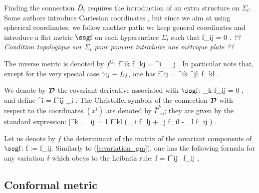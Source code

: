 Finding the connection $\tilde D_i$
requires the introduction of an extra structure 
on $\Sigma_t$. Some authors introduce Cartesian coordinates
\cite{ShibaN95,BaumgS98}, but since we aim at using spherical coordinates,
we follow another path: we keep general coordinates and introduce
a flat metric $\w{f}$ on each hypersurface $\Sigma_t$ such that
\be \label{e:f_notime}
	 f_{ij} = 0 . 
\ee
{\sl ?? Condition topologique sur $\Sigma_t$ pour pouvoir introduire
une m\'etrique plate ??}

The inverse metric is denoted by $f^{ij}$:
\be
	f^{ik} f_{kj} = \delta^i_{\ \, j} . 
\ee
In particular note that, except for the very special case
$\gamma_{ij}=f_{ij}$, one has
\be
	f^{ij} \not= \gm^{ik} \gm^{jl}\, f_{kl} .
\ee

We denote by $\mbox{\boldmath ${{\cal D}}$}$ the covariant derivative associated
with $\w{f}$:
\be \label{e:Df_zero}
	\cD_k f_{ij} = 0 , 
\ee
and define
\be \label{e:def_upcD}
	\cD^i = f^{ij} \cD_i . 
\ee
The Christoffel symbols of the connection $\mbox{\boldmath ${{\cal D}}$}$
with respect to the coordinates $(x^i)$ are denoted by 
$\bar\Gamma^k_{\ \, ij}$; they are given by the
standard expression:
\be \label{e:christo_f}
	\bar\Gamma^k_{\ \, ij} = {1} f^{kl} 
		\left( \partial_i f_{lj} +\partial_j f_{il}
			- \partial_l f_{ij} \right) .
\ee

Let us denote by $f$ the determinant of the matrix of the
covariant components of $\w{f}$:
\be \label{e:def_detf}
	f := \det f_{ij}.
\ee
Similarly to (\ref{e:variation_gm}), one has the following 
formula for any variation $\delta$ which obeys to the Leibnitz
rule:
\be \label{e:variation_f}
	\delta \ln f = f^{ij} \, \delta f_{ij} ,
\ee

\subsection{Conformal metric}

